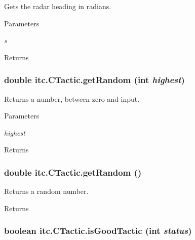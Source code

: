 \label{classitc_1_1_c_tactic_a4d8a555f548ee605c6d67de1e262b455}
Gets the radar heading in radians. 
\begin{DoxyParams}{Parameters}
\item[{\em s}]\end{DoxyParams}
\begin{DoxyReturn}{Returns}

\end{DoxyReturn}
\hypertarget{classitc_1_1_c_tactic_a89a1395008161bfeed448b60a4addc7d}{
\subsubsection[{getRandom}]{\setlength{\rightskip}{0pt plus 5cm}double itc.CTactic.getRandom (int {\em highest})}}
\label{classitc_1_1_c_tactic_a89a1395008161bfeed448b60a4addc7d}
Returns a number, between zero and input. 
\begin{DoxyParams}{Parameters}
\item[{\em highest}]\end{DoxyParams}
\begin{DoxyReturn}{Returns}

\end{DoxyReturn}
\hypertarget{classitc_1_1_c_tactic_ae1e7b81085c04b6d03be93dfefec5b0f}{
\subsubsection[{getRandom}]{\setlength{\rightskip}{0pt plus 5cm}double itc.CTactic.getRandom ()}}
\label{classitc_1_1_c_tactic_ae1e7b81085c04b6d03be93dfefec5b0f}
Returns a random number. \begin{DoxyReturn}{Returns}

\end{DoxyReturn}
\hypertarget{classitc_1_1_c_tactic_aefcf5f13687e17eaa8bf5dd4be3b424b}{
\subsubsection[{isGoodTactic}]{\setlength{\rightskip}{0pt plus 5cm}boolean itc.CTactic.isGoodTactic (int {\em status})}}
